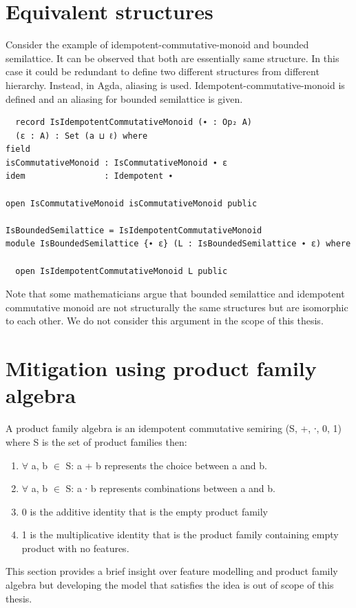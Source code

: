 \section{Equivalent structures}
Consider the example of idempotent-commutative-monoid and bounded semilattice.
It can be observed that both are essentially same structure. In this case it
could be redundant to define two different structures from different hierarchy.
Instead, in Agda, aliasing is used. Idempotent-commutative-monoid is defined and
an aliasing for bounded semilattice is given.
\begin{verbatim}
  record IsIdempotentCommutativeMonoid (∙ : Op₂ A)
  (ε : A) : Set (a ⊔ ℓ) where
field
isCommutativeMonoid : IsCommutativeMonoid ∙ ε
idem                : Idempotent ∙

open IsCommutativeMonoid isCommutativeMonoid public

IsBoundedSemilattice = IsIdempotentCommutativeMonoid
module IsBoundedSemilattice {∙ ε} (L : IsBoundedSemilattice ∙ ε) where

  open IsIdempotentCommutativeMonoid L public
\end{verbatim}

Note that some mathematicians argue that bounded semilattice and idempotent
commutative monoid are not structurally the same structures but are isomorphic
to each other. We do not consider this argument in the scope of this thesis.

\section{Mitigation using product family algebra}
A product family algebra is an idempotent commutative semiring (S, +,  ∙, 0, 1)
where S is the set of product families then:
\begin{enumerate}
 \item \(\forall\) a, b \(\in\) S: a + b represents the choice between a and b.
 \item \(\forall\) a, b \(\in\) S: a ∙ b represents combinations between a and
 b.
 \item 0 is the additive identity that is the empty product family \\
 \item 1 is the multiplicative identity that is the product family containing
 empty product with no features.
\end{enumerate}
This section provides a brief insight over feature modelling and product family
algebra but developing the model that satisfies the idea is out of scope of this
thesis.

